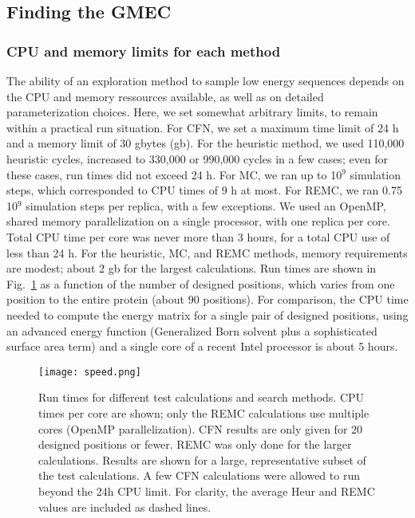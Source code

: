 \subsection{Finding the GMEC}
\subsubsection{CPU and memory limits for each method}
\label{BESTprotocol}
The ability of an exploration method to sample low energy sequences depends on the CPU and memory ressources available, as well as on detailed parameterization choices. Here, we set somewhat arbitrary limits, to remain within a practical run situation. For CFN, we set a maximum time limit of 24 h and a memory limit of 30 gbytes (gb). For the heuristic method, we used 110,000 heuristic cycles, increased to 330,000 or 990,000 cycles in a few cases; even for these cases, run times did not exceed 24 h. For MC, we ran up to 10$^9$ simulation steps, which corresponded to CPU times of 9 h at most. For REMC, we ran 0.75 10$^9$ simulation steps per replica, with a few exceptions. We used an OpenMP, shared memory parallelization on a single processor, with one replica per core. Total CPU time per core was never more than 3 hours, for a total CPU use of less than 24 h. For the heuristic, MC, and REMC methods, memory requirements are modest; about 2 gb for the largest calculations. Run times are shown in Fig.\ \ref{fig:cpu} as a function of the number of designed positions, which varies from one position to the entire protein (about 90 positions). For comparison, the CPU time needed to compute the energy matrix for a single pair of designed positions, using an advanced energy function (Generalized Born solvent plus a sophisticated surface area term) and a single core of a recent Intel processor is about 5 hours.


    \begin{figure}[!htbp]
      \centering
        \texttt{[image: speed.png]} 
      \caption{
Run times for different test calculations and search methods. CPU times per core are shown; only the REMC calculations use multiple cores (OpenMP parallelization). CFN results are only given for 20 designed positions or fewer. REMC was only done for the larger calculations. Results are shown for a large, representative subset of the test calculations. A few CFN calculations were allowed to run beyond the 24h CPU limit. For clarity, the average Heur and REMC values are included as dashed lines.
      }
      
      \label{fig:cpu}
    \end{figure}

